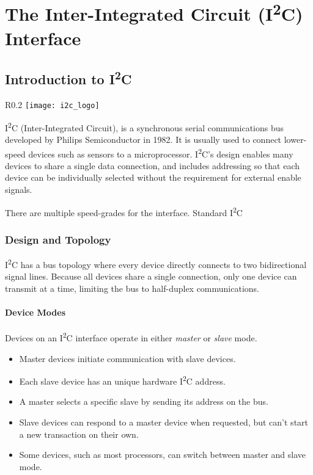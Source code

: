 \documentclass[11pt,fleqn]{book} %
\begin{document}
	
\chapter{The Inter-Integrated Circuit (I\textsuperscript{2}C) Interface}

\section{Introduction to I\textsuperscript{2}C}
    \begin{wrapfigure}{R}{0.2\textwidth}
        \centering\texttt{[image: i2c\_logo]}
    \end{wrapfigure}

    I\textsuperscript{2}C (Inter-Integrated Circuit), is a synchronous serial communications bus developed by Philips Semiconductor in 1982. It is usually used to connect lower-speed devices such as sensors to a microprocessor. I\textsuperscript{2}C's design enables many devices to share a single data connection, and includes addressing so that each device can be individually selected without the requirement for external enable signals.
    
    There are multiple speed-grades for the interface. Standard I\textsuperscript{2}C

    \subsection{Design and Topology}
            I\textsuperscript{2}C has a bus topology where every device directly connects to two bidirectional signal lines. Because all devices share a single connection, only one device can transmit at a time, limiting the bus to half-duplex communications. 

            \subsubsection{Device Modes}
            Devices on an I\textsuperscript{2}C interface operate in either \textit{master} or \textit{slave} mode. 
            \begin{itemize}
                \item Master devices initiate communication with slave devices.
                \item Each slave device has an unique hardware I\textsuperscript{2}C address.
                \item A master selects a specific slave by sending its address on the bus.
                \item Slave devices can respond to a master device when requested, but can't start a new transaction on their own.
                \item Some devices, such as most processors, can switch between master and slave mode.
            \end{itemize}
        
\end{document}
